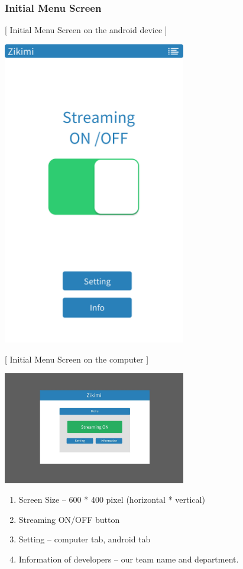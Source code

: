 \documentclass[12pt]{article}
\begin{document}
\subsubsection{Initial Menu Screen}
\begin{center}
[ Initial Menu Screen on the android device ] \\ [1\baselineskip]
\end{center}
\begin{center} 
\includegraphics[width=80mm,scale=1.2]{InitialMenuScreen}
\end{center}
\begin{center}
[ Initial Menu Screen on the computer ] \\ [1\baselineskip]
\end{center}
\begin{center} 
\includegraphics[width=80mm,scale=1.2]{initialmenuscreencomputer}
\end{center}
\begin{enumerate}
\item Screen Size – 600 * 400 pixel (horizontal * vertical)
\item Streaming ON/OFF button
\item Setting – computer tab, android tab
\item Information of developers – our team name and department.
\end{enumerate}
\end{document}
